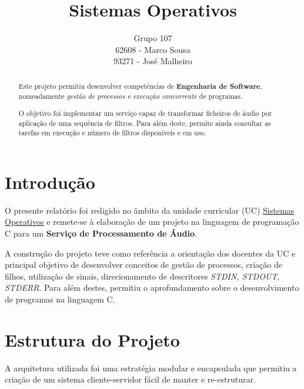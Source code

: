 \documentclass[11pt]{article}
\title{Sistemas Operativos}
\author{Grupo 107 \\ 62608 - Marco Sousa \\ 93271 - José Malheiro}
\begin{document}
\maketitle

\begin{abstract}
    Este projeto permitiu desenvolver competências de \textbf{Engenharia de Software},
    nomeadamente \textit{gestão de processos e execução concorrente } de programas.

    O objetivo foi implementar um serviço capaz de transformar ficheiros de áudio por aplicação de uma sequência de filtros.
    Para além deste, permite ainda consultar as tarefas em execução e número de filtros disponíveis e em uso.
\end{abstract}

\section{Introdução}

O presente relatório foi redigido no âmbito da unidade curricular (UC) \underline{Sistemas Operativos}
e remete-se à elaboração de um projeto na linguagem de programação C para um \textbf{Serviço de Processamento de Áudio}.

A construção do projeto teve como referência a orientação dos docentes da UC e principal objetivo de desenvolver
conceitos de gestão de processos, criação de filhos, utilização de sinais, direcionamento de descritores \textit{STDIN, STDOUT, STDERR}.
Para além destes, permitiu o aprofundamento sobre o desenvolvimento de programas na linguagem C.

\section{Estrutura do Projeto}

A arquitetura utilizada foi uma estratégia modular e encapsulada que permitiu a criação de um sistema cliente-servidor fácil de manter e re-estruturar.
\end{document}
